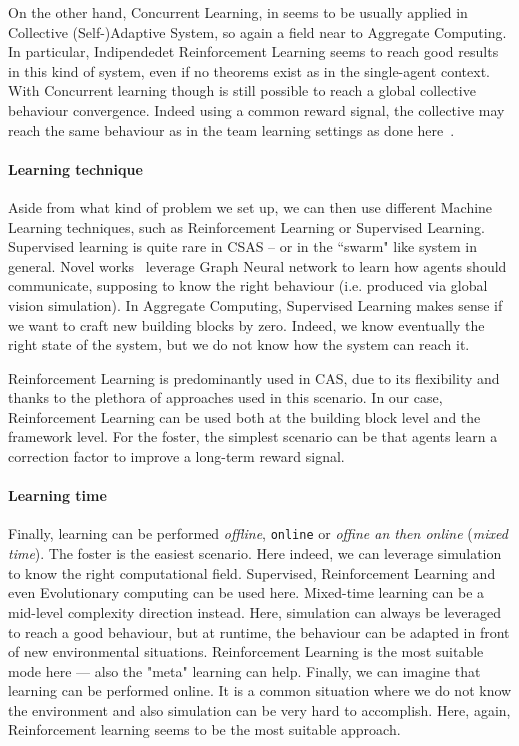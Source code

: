 \documentclass[
  twocolumn,
]{ceurart}
\begin{document}
On the other hand, Concurrent Learning, in \cite{csas-and-marl} seems to be usually applied in Collective
 (Self-)Adaptive System, so again a field near to Aggregate Computing. 
 In particular, Indipendedet Reinforcement Learning seems to reach good results in this kind of system, 
 even if no theorems exist as in the single-agent context.
%
With Concurrent learning though is still possible to reach a global collective behaviour convergence. 
 Indeed using a common reward signal, the collective may reach the same behaviour as in the team learning settings as done here~\cite{iima2008swarm}.

\paragraph{Learning technique}
Aside from what kind of problem we set up, we can then use different Machine Learning techniques,
 such as Reinforcement Learning or Supervised Learning.
%
Supervised learning is quite rare in CSAS -- or in the ``swarm" like system in general.
%
Novel works~\cite{DBLP:conf/corl/TolstayaGPP0R19} leverage Graph Neural network to learn how agents should communicate, supposing to know the right behaviour (i.e. produced via global vision simulation).
%
In Aggregate Computing, Supervised Learning makes sense if we want to craft new building blocks by zero. 
% 
Indeed, we know eventually the right state of the system, but we do not know how the system can reach it.

Reinforcement Learning is predominantly used in CAS, 
 due to its flexibility and thanks to the plethora of approaches used in this scenario.
% 
In our case, Reinforcement Learning can be used both at the building block level and the framework level.
%
For the foster, the simplest scenario can be that agents learn a correction factor to improve a long-term reward signal.
 
\paragraph{Learning time}
Finally, learning can be performed \textit{offline}, \texttt{online} or \textit{offine an then online} (\textit{mixed time}).
% 
The foster is the easiest scenario.
 Here indeed, we can leverage simulation to know the right computational field.
% 
Supervised, Reinforcement Learning and even Evolutionary computing can be used here.
%
Mixed-time learning can be a mid-level complexity direction instead.
 Here, simulation can always be leveraged to reach a good behaviour, but at runtime, the behaviour can be adapted in front of new environmental situations. 
%
Reinforcement Learning is the most suitable mode here --- also the "meta" learning can help.
%
Finally, we can imagine that learning can be performed online. 
 It is a common situation where we do not know the environment and also simulation can be very hard to accomplish. 
 Here, again, Reinforcement learning seems to be the most suitable approach.
 
\end{document}
